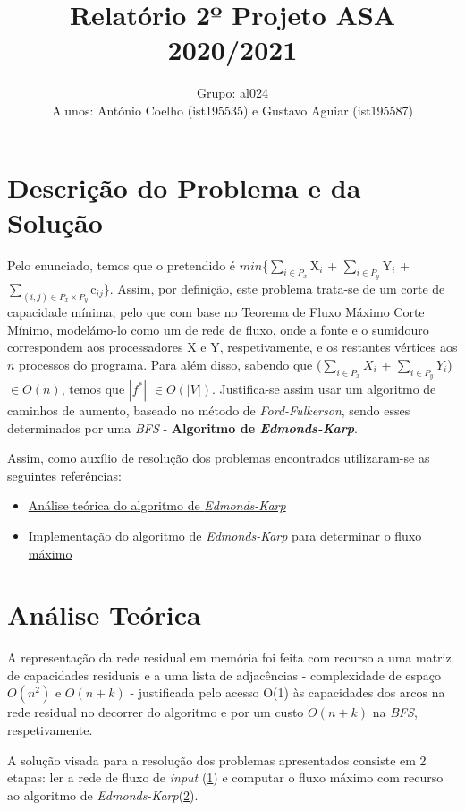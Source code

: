 \documentclass[12pt]{article}
\author{
	Grupo: al024\\Alunos: António Coelho (ist195535) e Gustavo Aguiar (ist195587)
}
\title{\vspace{-2cm}Relatório 2º Projeto ASA 2020/2021}
\date{}
\begin{document}
\maketitle
\section{Descrição do Problema e da Solução}
Pelo enunciado, temos que o pretendido é $min$\{$\sum_{i\in{P_{x}}}$X$_{i}$ + $\sum_{i\in{P_{y}}}$Y$_{i}$ + $\sum_{(i, j)\in{P_{x} \times P_{y}}}$c$_{ij}$\}. Assim, por definição, este problema trata-se de um corte de capacidade mínima, pelo que com base no Teorema de Fluxo Máximo Corte Mínimo, modelámo-lo como um de rede de fluxo, onde a fonte e o sumidouro correspondem aos processadores X e Y, respetivamente, e os restantes vértices aos $n$ processos do programa.
Para além disso, sabendo que ($\sum_{i\in{P_{x}}}$$X_{i}$ + $\sum_{i\in{P_{y}}}$$Y_{i}$) $\in{O(n)}$, temos que $\left|f^{*}\right|$ $\in{O(\left|V\right|)}$. Justifica-se assim usar um algoritmo de caminhos de aumento, baseado no método de \emph{Ford-Fulkerson}, sendo esses determinados por uma \emph{BFS} - \textbf{Algoritmo de \emph{Edmonds-Karp}}.

Assim, como auxílio de resolução dos problemas encontrados utilizaram-se as seguintes referências:
\begin{itemize}
\item\href{https://brilliant.org/wiki/edmonds-karp-algorithm/}{Análise teórica do algoritmo de \emph{Edmonds-Karp}}
\item\href{https://www.geeksforgeeks.org/ford-fulkerson-algorithm-for-maximum-flow-problem/}{Implementação do algoritmo de \emph{Edmonds-Karp} para determinar o fluxo máximo}
\end{itemize}
 
\section{Análise Teórica}
A representação da rede residual em memória foi feita com recurso a uma matriz de capacidades residuais e a uma lista de adjacências - complexidade de espaço $O(n^2)$ e $O(n + k)$ - justificada pelo acesso O(1) às capacidades dos arcos na rede residual no decorrer do algoritmo e por um custo $O(n+k)$ na \emph{BFS}, respetivamente.

A solução visada para a resolução dos problemas apresentados consiste em 2 etapas: ler a rede de fluxo de \emph{input} (\underline{1}) e computar o fluxo máximo com recurso ao algoritmo de \emph{Edmonds-Karp}(\underline{2}).
\end{document}

